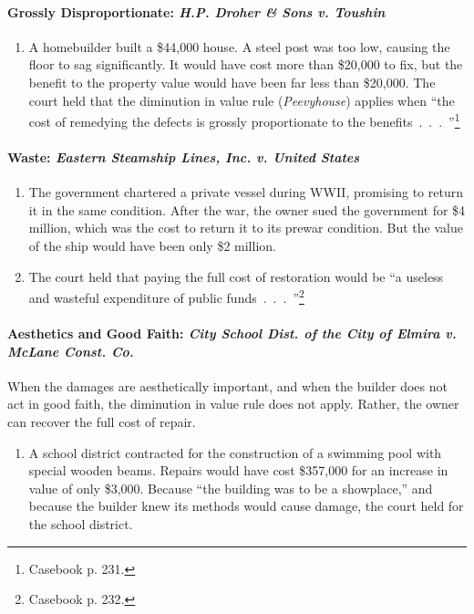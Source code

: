 \paragraph{Grossly Disproportionate: \emph{H.P. Droher \& Sons v. Toushin}}

\begin{enumerate}
    \item A homebuilder built a \$44,000 house. A steel post was too low, 
    causing the floor to sag significantly. It would have cost more than 
    \$20,000 to fix, but the benefit to the property value would have been far 
    less than \$20,000. The court held that the diminution in value rule 
    (\emph{Peevyhouse}) applies when ``the cost of remedying the defects is 
    grossly proportionate to the benefits~.~.~.~''\footnote{Casebook p. 231.}
\end{enumerate}

\paragraph{Waste: \emph{Eastern Steamship Lines, Inc. v. United States}}

\begin{enumerate}
    \item The government chartered a private vessel during WWII, promising to 
    return it in the same condition. After the war, the owner sued the 
    government for \$4 million, which was the cost to return it to its prewar 
    condition. But the value of the ship would have been only \$2 million. 
    \item The court held that paying the full cost of restoration would be ``a 
    useless and wasteful expenditure of public 
    funds~.~.~.~''\footnote{Casebook p. 232.}
\end{enumerate}

\paragraph{Aesthetics and Good Faith: \emph{City School Dist. of the City of 
Elmira v.  McLane Const.  Co.}}

When the damages are aesthetically important, and when the builder does not 
act in good faith, the diminution in value rule does not apply. Rather, the 
owner can recover the full cost of repair.

\begin{enumerate}
    \item A school district contracted for the construction of a swimming pool 
    with special wooden beams. Repairs would have cost \$357,000 for an 
    increase in value of only \$3,000. Because ``the building was to be a 
    showplace,'' and because the builder knew its methods would cause damage, 
    the court held for the school district.
\end{enumerate}

